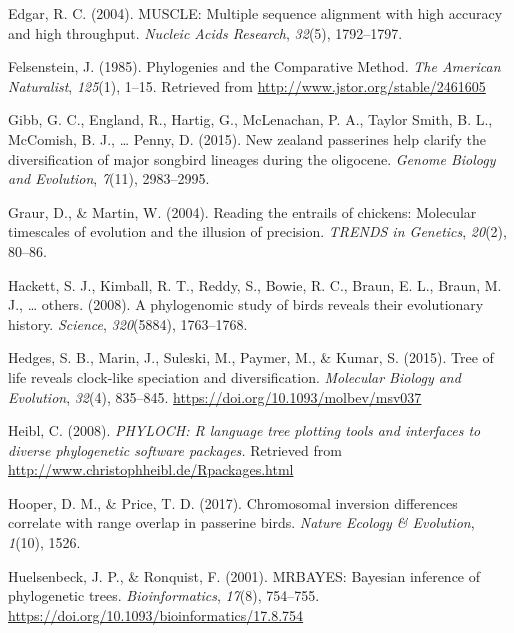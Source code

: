 \documentclass[
  man]{apa6}
\newlength{\cslhangindent}
\newlength{\cslentryspacingunit} %
\newenvironment{CSLReferences}[2] %
 {%
  \setlength{\parindent}{0pt}
  \ifodd #1
  \let\oldpar\par
  \def\par{\hangindent=\cslhangindent\oldpar}
  \fi
  \setlength{\parskip}{#2\cslentryspacingunit}
 }%
 {}
\begin{document}
\begin{CSLReferences}{1}{0}
\leavevmode{}%
Edgar, R. C. (2004). MUSCLE: Multiple sequence alignment with high accuracy and high throughput. \emph{Nucleic Acids Research}, \emph{32}(5), 1792--1797.

\leavevmode{}%
Felsenstein, J. (1985). {Phylogenies and the Comparative Method}. \emph{The American Naturalist}, \emph{125}(1), 1--15. Retrieved from \url{http://www.jstor.org/stable/2461605}

\leavevmode{}%
Gibb, G. C., England, R., Hartig, G., McLenachan, P. A., Taylor Smith, B. L., McComish, B. J., \ldots{} Penny, D. (2015). New zealand passerines help clarify the diversification of major songbird lineages during the oligocene. \emph{{Genome Biology and Evolution}}, \emph{7}(11), 2983--2995.

\leavevmode{}%
Graur, D., \& Martin, W. (2004). Reading the entrails of chickens: Molecular timescales of evolution and the illusion of precision. \emph{TRENDS in Genetics}, \emph{20}(2), 80--86.

\leavevmode{}%
Hackett, S. J., Kimball, R. T., Reddy, S., Bowie, R. C., Braun, E. L., Braun, M. J., \ldots{} others. (2008). A phylogenomic study of birds reveals their evolutionary history. \emph{Science}, \emph{320}(5884), 1763--1768.

\leavevmode{}%
Hedges, S. B., Marin, J., Suleski, M., Paymer, M., \& Kumar, S. (2015). {Tree of life reveals clock-like speciation and diversification}. \emph{{Molecular Biology and Evolution}}, \emph{32}(4), 835--845. \url{https://doi.org/10.1093/molbev/msv037}

\leavevmode{}%
Heibl, C. (2008). \emph{PHYLOCH: R language tree plotting tools and interfaces to diverse phylogenetic software packages.} Retrieved from \url{http://www.christophheibl.de/Rpackages.html}

\leavevmode{}%
Hooper, D. M., \& Price, T. D. (2017). Chromosomal inversion differences correlate with range overlap in passerine birds. \emph{Nature Ecology \& Evolution}, \emph{1}(10), 1526.

\leavevmode{}%
Huelsenbeck, J. P., \& Ronquist, F. (2001). {MRBAYES: Bayesian inference of phylogenetic trees}. \emph{Bioinformatics}, \emph{17}(8), 754--755. \url{https://doi.org/10.1093/bioinformatics/17.8.754}


\end{CSLReferences}
\end{document}
